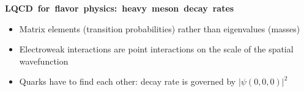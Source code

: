 \documentclass[landscape]{article}
\newenvironment{slide}[1][ ]{\mbox{\bf #1 } \vfill}{\vfill \mbox{ } \pagebreak}
\begin{document}




\begin{slide}[LQCD for flavor physics: heavy meson decay rates]

\begin{itemize}

  \item Matrix elements (transition probabilities) rather than
  eigenvalues (masses)

  \vfill
  \item Electroweak interactions are point interactions on the scale
  of the spatial wavefunction

  \vfill
  \item Quarks have to find each other: decay rate is governed by
  $|\psi(0,0,0)|^2$


\end{itemize}
\end{slide}
\end{document}
